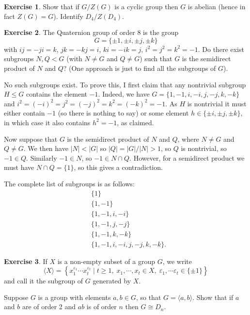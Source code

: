 \documentclass{amsart}
\renewcommand{\:}{\colon}
\newcommand{\st}{\;|\;}
\theoremstyle{definition}
\newtheorem{exercise}{Exercise}
\newenvironment{solution}{{\noindent\bf Solution:}}{}
\begin{document}
\begin{exercise}
 Show that if $G/Z(G)$ is a cyclic group then $G$ is abelian (hence
 in fact $Z(G)=G$). Identify $D_4/Z(D_4)$.
\end{exercise}
\begin{solution}

\end{solution}

\begin{exercise}
 The Quaternion group of order 8  is the group
 \[ G = \{\pm 1, \pm i, \pm j, \pm k \} \]
 with $ij=-ji=k$, $jk=-kj=i$, $ki=-ik=j$, $i^2=j^2=k^2=-1$. 
 Do there exist subgroups $N,Q<G$ (with $N\neq G$ and $Q\neq G$) such
 that $G$ is the semidirect product of $N$ and $Q$?  (One approach is
 just to find all the subgroups of $G$).
\end{exercise}
\begin{solution}
 No such subgroups exist.  To prove this, I first claim that any
 nontrivial subgroup $H\leq G$ contains the element $-1$.  Indeed, we
 have $G=\{1,-1,i,-i,j,-j,k,-k\}$ and
 $i^2=(-i)^2=j^2=(-j)^2=k^2=(-k)^2=-1$.  As $H$ is nontrivial it must
 either contain $-1$ (so there is nothing to say) or some element
 $h\in\{\pm i,\pm j,\pm k\}$, in which case it also contains $h^2=-1$,
 as claimed.  

 Now suppose that $G$ is the semidirect product of $N$ and $Q$, where
 $N\neq G$ and $Q\neq G$.  We then have $|N|<|G|$ so $|Q|=|G|/|N|>1$,
 so $Q$ is nontrivial, so $-1\in Q$.  Similarly $-1\in N$, so
 $-1\in N\cap Q$.  However, for a semidirect product we must have
 $N\cap Q=\{1\}$, so this gives a contradiction.
 
 The complete list of subgroups is as follows:
 \begin{align*}
  & \{1\} \\
  & \{1,-1\} \\
  & \{1,-1,i,-i\} \\
  & \{1,-1,j,-j\} \\
  & \{1,-1,k,-k\} \\
  & \{1,-1,i,-i,j,-j,k,-k\}.
 \end{align*}
\end{solution}

\begin{exercise}
 If $X$ is a non-empty subset of a group $G$, we write
 \[ \langle X \rangle = 
    \left\{ x_1^{\varepsilon_1} \cdots x_t^{\varepsilon_t}
     \st t \geq 1, \; x_1,\cdots, x_t\in X, \;
         \varepsilon_1, \cdots \varepsilon_t \in \{\pm 1\} \right\}
 \]
 and call it the subgroup of $G$ generated by $X$.

 Suppose $G$ is a group with elements $a, b \in G$, so that 
 $G=\langle a,b\rangle$. Show that if $a$ and $b$ are of order 2 and
 $ab$ is of order $n$ then $G \cong D_n$.
\end{exercise}
\begin{solution}

\end{solution}
\end{document}
